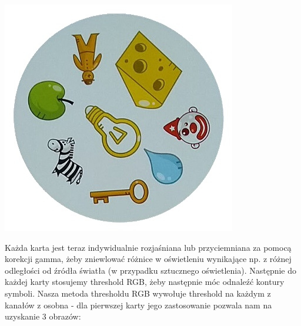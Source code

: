 \documentclass[10pt,a4paper]{article}
\begin{document}
\begin{center}
\includegraphics[scale=0.25]{2.1/card5.jpg}
\end{center}
Każda karta jest teraz indywidualnie rozjaśniana lub przyciemniana za pomocą korekcji gamma, żeby zniewlować różnice w oświetleniu wynikające np. z różnej odległości od źródła światła (w przypadku sztucznego oświetlenia).
Następnie do każdej karty stosujemy threshold RGB, żeby następnie móc odnaleźć kontury symboli. Nasza metoda thresholdu RGB wywołuje threshold na każdym z kanałów z osobna - dla pierwszej karty jego zastosowanie pozwala nam na uzyskanie 3 obrazów:
\end{document}
